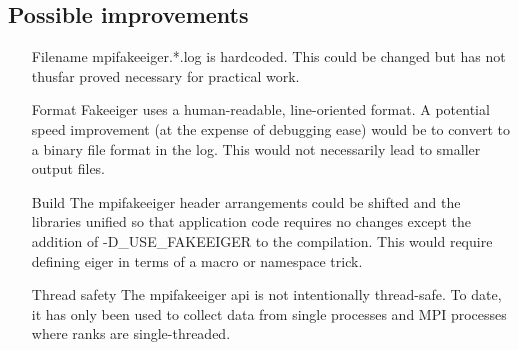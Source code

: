 \subsection{Possible improvements}

\begin{itemize}
\item[Filename] mpifakeeiger.*.log is hardcoded. This could be changed but has not thusfar proved necessary for practical work.
\item[Format] Fakeeiger uses a human-readable, line-oriented format. A potential speed improvement (at the expense of debugging ease) would be to convert to a binary file format in the log. This would not necessarily lead to smaller output files.
\item[Build] The mpifakeeiger header arrangements could be shifted and the libraries unified so that application code requires no changes except the addition of -D\_USE\_FAKEEIGER to the compilation. This would require defining eiger in terms of a macro or namespace trick.
\item[Thread safety] The mpifakeeiger api is not intentionally thread-safe. To date, it has only been used to collect data from single processes and MPI processes where ranks are single-threaded. 
\end{itemize}

